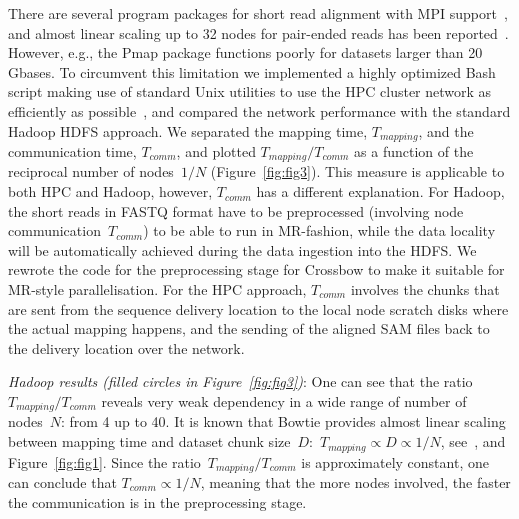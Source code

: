 \documentclass[11pt, oneside]{article}   	%
\begin{document}
There are several program packages for short read alignment with MPI support~\cite{pmap, gnumap}, and almost linear scaling up to 32 nodes for pair-ended reads has been reported~\cite{Bozdag:2010cn}. However, e.g., the Pmap package functions poorly for datasets larger than 20 Gbases. To circumvent this limitation we implemented a highly optimized Bash script making use of standard Unix utilities to use the HPC cluster network as efficiently as possible~\cite{code_repo}, and compared the network performance with the standard Hadoop HDFS approach. We separated the mapping time, $T_{mapping}$, and the communication time, $T_{comm}$, and plotted $T_{mapping}/T_{comm}$ as a function of the reciprocal number of nodes~$1/N$ (Figure~\ref{fig:fig3}). 
This measure is applicable to both HPC and Hadoop, however, $T_{comm}$ has a different explanation. For Hadoop, the short reads in FASTQ format have to be preprocessed (involving node communication~$T_{comm}$) to be able to run in MR-fashion, while the data locality will be automatically achieved during the data ingestion into the HDFS. 
We rewrote the code for the preprocessing stage for Crossbow to make it suitable for MR-style parallelisation.
For the HPC approach, $T_{comm}$ involves the chunks that are sent from the sequence delivery location to the local node scratch disks where the actual mapping happens, and the sending of the aligned SAM files back to the delivery location over the network.


\textit{Hadoop results (filled circles in Figure~\ref{fig:fig3})}: One can see that the ratio~$T_{mapping}/T_{comm}$ reveals very weak dependency in a wide range of number of nodes~$N$: from 4 up to 40. It is known that Bowtie provides almost linear scaling between mapping time and dataset chunk size~$D$:~$T_{mapping}\propto  D\propto 1/N$, see~\cite{bowtie}, and Figure~\ref{fig:fig1}. Since the ratio~$T_{mapping}/T_{comm}$ is approximately constant, one can conclude that $T_{comm}\propto 1/N$, meaning that the more nodes involved, the faster the communication is in the preprocessing stage.
\end{document}
